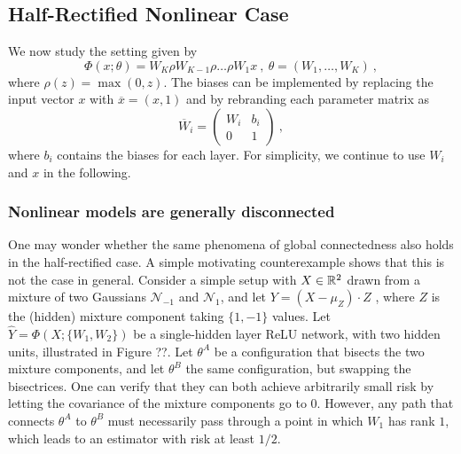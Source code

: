 \subsection{Half-Rectified Nonlinear Case}

We now study the setting given by 
\begin{equation}
\label{relucase}
\Phi(x;\theta) = W_K \rho W_{K-1} \rho \dots \rho W_1 x~,~\theta = (W_1, \dots, W_K)~,
\end{equation}
where $\rho(z) = \max(0 ,z)$. 
The biases can be implemented by replacing the input vector $x$ 
with $\overline{x}=(x, 1)$ and by rebranding each parameter matrix as 
$$\overline{W}_i = \left( 
\begin{array}{c|c}
W_i & b_i \\
\hline 
0 & 1 
\end{array}
\right)~,$$
where $b_i$ contains the biases for each layer.	
For simplicity, we continue to use $W_i$ and $x$ in the following.

\subsubsection{Nonlinear models are generally disconnected}
\label{disconnect}

One may wonder whether the same phenomena of global connectedness also holds 
in the half-rectified case. A simple motivating counterexample shows that this is not the case in 
general. Consider a simple setup with $X \in {\mathbb{R}}^2$ drawn from a mixture of two Gaussians $\mathcal{N}_{-1}$ 
and $\mathcal{N}_{1}$, and let $Y = (X-\mu_Z) \cdot Z $ , where $Z$ is the (hidden) mixture component taking $\{1,-1\}$ values.  Let 
$\hat{Y} = \Phi(X; \{ W_1, W_2\} )$ be a single-hidden layer ReLU network, with two hidden units, 
illustrated in Figure ??. 
Let $\theta^A$ be a configuration that bisects the two mixture components, 
and let $\theta^B$ the same configuration, but swapping the bisectrices. 
One can verify that they can both achieve arbitrarily small risk by letting the covariance of the mixture components go to $0$. 
However, any path that connects $\theta^A$ to $\theta^B$ 
must necessarily pass through a point in which $W_1$ has rank $1$, which leads to an estimator with risk at least $1/2$.  

